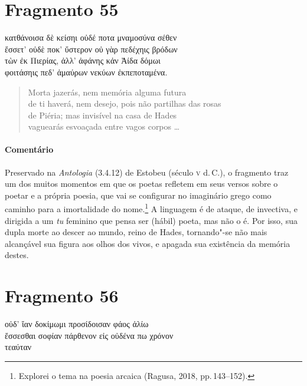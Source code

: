 \section{Fragmento 55}

\begin{gkverse}
κατθάνοισα δὲ κείσηι οὐδέ ποτα μναμοσύνα σέθεν\\
ἔσσετ’ οὐδὲ \dagger{}ποκ’\dagger{} ὔστερον οὐ γὰρ πεδέχηις βρόδων\\
τὼν ἐκ Πιερίας, ἀλλ’ ἀφάνης κἀν Ἀίδα δόμωι\\
φοιτάσηις πεδ’ ἀμαύρων νεκύων ἐκπεποταμένα.
\end{gkverse}


\begin{verse}
Morta jazerás, nem memória alguma futura\\
de ti haverá, nem desejo, pois não partilhas das rosas\\
de Piéria; mas invisível na casa de Hades\\
vaguearás esvoaçada entre vagos corpos \ldots{}
\end{verse}

\medskip

{\paragraph{Comentário} Preservado na \emph{Antologia} (3.4.12) de Estobeu (século \textsc{v} d.\,C.), o fragmento traz um dos muitos momentos em que os poetas refletem em seus versos
sobre o poetar e a própria poesia, que vai se configurar no imaginário grego
como caminho para a imortalidade do nome.\footnote{Explorei o tema na poesia arcaica (Ragusa, 2018, pp.\,143--152).} A linguagem é de ataque, de
invectiva, e dirigida a um \emph{tu} feminino que pensa ser (hábil) poeta, mas
não o é. Por isso, sua dupla morte ao descer ao mundo, reino de
Hades, tornando"-se não mais alcançável sua figura aos olhos dos vivos, e
apagada sua existência da memória destes.}

\section{Fragmento 56}

\begin{gkverse}
οὐδ’ ἴαν δοκίμωμι προσίδοισαν φάος ἀλίω\\
ἔσσεσθαι σοφίαν πάρθενον εἰς οὐδένα πω χρόνον\\
τεαύταν
\end{gkverse}

